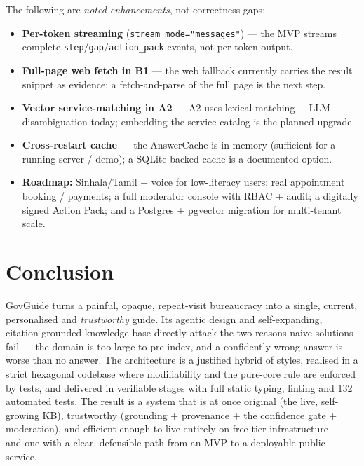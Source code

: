 \documentclass[11pt,a4paper]{article}
\begin{document}
The following are \emph{noted enhancements}, not correctness gaps:
\begin{itemize}[leftmargin=1.4em]
  \item \textbf{Per-token streaming} (\texttt{stream\_mode="messages"}) --- the MVP streams complete
        \texttt{step}/\texttt{gap}/\texttt{action\_pack} events, not per-token output.
  \item \textbf{Full-page web fetch in B1} --- the web fallback currently carries the result snippet
        as evidence; a fetch-and-parse of the full page is the next step.
  \item \textbf{Vector service-matching in A2} --- A2 uses lexical matching + LLM disambiguation today;
        embedding the service catalog is the planned upgrade.
  \item \textbf{Cross-restart cache} --- the AnswerCache is in-memory (sufficient for a running server /
        demo); a SQLite-backed cache is a documented option.
  \item \textbf{Roadmap:} Sinhala/Tamil + voice for low-literacy users; real appointment booking /
        payments; a full moderator console with RBAC + audit; a digitally signed Action Pack; and a
        Postgres + pgvector migration for multi-tenant scale.
\end{itemize}

\section{Conclusion}
\label{sec:conclusion}

GovGuide turns a painful, opaque, repeat-visit bureaucracy into a single, current, personalised and
\emph{trustworthy} guide. Its agentic design and self-expanding, citation-grounded knowledge base
directly attack the two reasons naive solutions fail --- the domain is too large to pre-index, and a
confidently wrong answer is worse than no answer. The architecture is a justified hybrid of styles,
realised in a strict hexagonal codebase where modifiability and the pure-core rule are enforced by
tests, and delivered in verifiable stages with full static typing, linting and 132 automated tests.
The result is a system that is at once original (the live, self-growing KB), trustworthy (grounding +
provenance + the confidence gate + moderation), and efficient enough to live entirely on free-tier
infrastructure --- and one with a clear, defensible path from an MVP to a deployable public
service.
\end{document}
